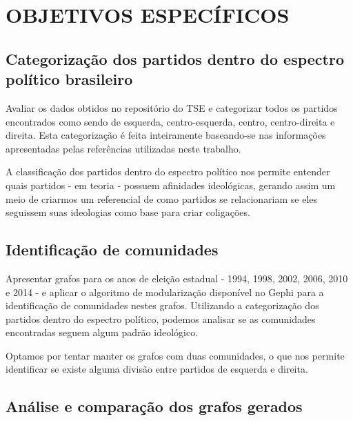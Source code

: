 \section{\texorpdfstring{\MakeUppercase{Objetivos Específicos}}{}}
\label{proposta__objetivos-especificos}

\subsection{Categorização dos partidos dentro do espectro político brasileiro}
\label{proposta__objetivos-especificos--categorizacao}

Avaliar os dados obtidos no repositório do \gls{TSE} e categorizar todos os partidos encontrados como sendo de esquerda, centro-esquerda, centro, centro-direita e direita. Esta categorização é feita inteiramente baseando-se nas informações apresentadas pelas referências utilizadas neste trabalho.

A classificação dos partidos dentro do espectro político nos permite entender quais partidos - em teoria - possuem afinidades ideológicas, gerando assim um meio de criarmos um referencial de como partidos se relacionariam se eles seguissem suas ideologias como base para criar coligações.

\subsection{Identificação de comunidades}
\label{proposta__objetivos-especificos--identificacao-comunidades}

Apresentar grafos para os anos de eleição estadual - 1994, 1998, 2002, 2006, 2010 e 2014 - e aplicar o algoritmo de modularização disponível no Gephi para a identificação de comunidades nestes grafos. Utilizando a categorização dos partidos dentro do espectro político, podemos analisar se as comunidades encontradas seguem algum padrão ideológico.

Optamos por tentar manter os grafos com duas comunidades, o que nos permite identificar se existe alguma divisão entre partidos de esquerda e direita.

\subsection{Análise e comparação dos grafos gerados}
\label{proposta__objetivos-especificos--analise-comparacao}

